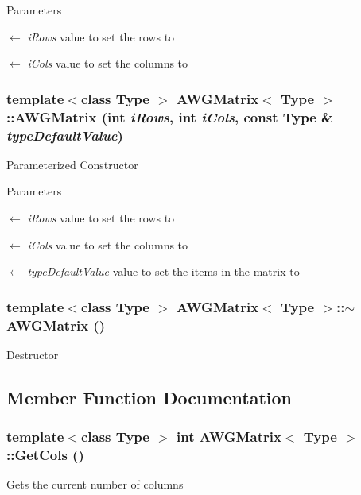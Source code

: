 \begin{DoxyParams}{Parameters}
\item[\mbox{$\leftarrow$} {\em iRows}]value to set the rows to \item[\mbox{$\leftarrow$} {\em iCols}]value to set the columns to \end{DoxyParams}
\hypertarget{classAWGMatrix_a25a1a3309975aabb6a1dc89a1163f24c}{
\subsubsection[{AWGMatrix}]{\setlength{\rightskip}{0pt plus 5cm}template$<$class Type $>$ {\bf AWGMatrix}$<$ Type $>$::{\bf AWGMatrix} (int {\em iRows}, \/  int {\em iCols}, \/  const Type \& {\em typeDefaultValue})}}
\label{classAWGMatrix_a25a1a3309975aabb6a1dc89a1163f24c}
Parameterized Constructor


\begin{DoxyParams}{Parameters}
\item[\mbox{$\leftarrow$} {\em iRows}]value to set the rows to \item[\mbox{$\leftarrow$} {\em iCols}]value to set the columns to \item[\mbox{$\leftarrow$} {\em typeDefaultValue}]value to set the items in the matrix to \end{DoxyParams}
\hypertarget{classAWGMatrix_aedeef2430ef09118c42668d50f11b755}{
\subsubsection[{$\sim$AWGMatrix}]{\setlength{\rightskip}{0pt plus 5cm}template$<$class Type $>$ {\bf AWGMatrix}$<$ Type $>$::$\sim${\bf AWGMatrix} ()}}
\label{classAWGMatrix_aedeef2430ef09118c42668d50f11b755}
Destructor 

\subsection{Member Function Documentation}
\hypertarget{classAWGMatrix_a9e7cfb5fc604eed9b7a6eab8e0dda9fd}{
\subsubsection[{GetCols}]{\setlength{\rightskip}{0pt plus 5cm}template$<$class Type $>$ int {\bf AWGMatrix}$<$ Type $>$::GetCols ()}}
\label{classAWGMatrix_a9e7cfb5fc604eed9b7a6eab8e0dda9fd}
Gets the current number of columns

